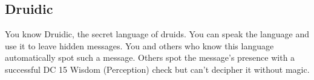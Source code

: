 \documentclass[letterpaper,openany,oneside,twocolumn]{book}
\begin{document}
\subsection*{Druidic}
You know Druidic, the secret language of druids. You can speak the language and use it to leave hidden messages. You and others who know this language automatically spot such a message. Others spot the message's presence with a successful DC 15 Wisdom (Perception) check but can't decipher it without magic.
%
%
%
%
\end{document}
